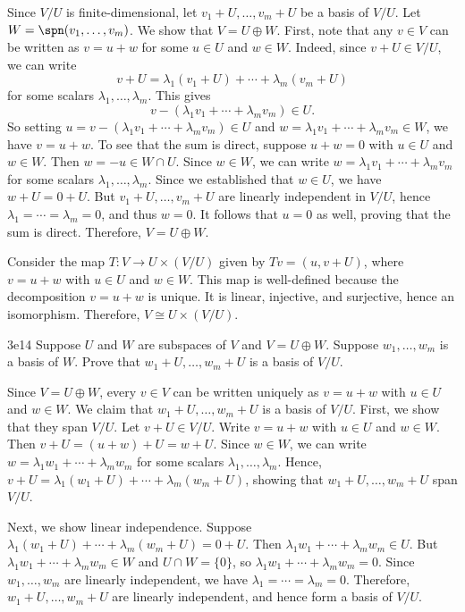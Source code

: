\begin{sol}
    Since $V / U$ is finite-dimensional, let $v_1 + U, \ldots, v_m + U$ be a basis of $V / U$.
	Let $W = \spn(v_1, \ldots, v_m)$.
	We show that $V = U \oplus W$.
	First, note that any $v \in V$ can be written as $v = u + w$ for some $u \in U$ and $w \in W$.
	Indeed, since $v + U \in V / U$, we can write
    \[
    	v + U = \lambda_1 (v_1 + U) + \cdots + \lambda_m (v_m + U)
    \]
    for some scalars $\lambda_1, \ldots, \lambda_m$.
	This gives
    \[
    	v - (\lambda_1 v_1 + \cdots + \lambda_m v_m) \in U.
    \]
    So setting $u = v - (\lambda_1 v_1 + \cdots + \lambda_m v_m) \in U$ and $w = \lambda_1 v_1 + \cdots + \lambda_m v_m \in W$, we have $v = u + w$.
	To see that the sum is direct, suppose $u + w = 0$ with $u \in U$ and $w \in W$.
	Then $w = -u \in W \cap U$.
	Since $w \in W$, we can write $w = \lambda_1 v_1 + \cdots + \lambda_m v_m$ for some scalars $\lambda_1, \ldots, \lambda_m$.
	Since we established that $w \in U$, we have $w + U = 0 + U$.
	But $v_1 + U, \ldots, v_m + U$ are linearly independent in $V / U$, hence $\lambda_1 = \cdots = \lambda_m = 0$, and thus $w = 0$.
	It follows that $u = 0$ as well, proving that the sum is direct.
	Therefore, $V = U \oplus W$.

    Consider the map $T : V \to U \times (V/U)$ given by $Tv = (u, v + U)$, where $v = u + w$ with $u \in U$ and $w \in W$.
	This map is well-defined because the decomposition $v = u + w$ is unique.
	It is linear, injective, and surjective, hence an isomorphism.
	Therefore, $V \cong U \times (V/U)$.
\end{sol}

\begin{exercise}{3e14}
    Suppose $U$ and $W$ are subspaces of $V$ and $V = U \oplus W$.
	Suppose $w_1, \ldots, w_m$ is a basis of $W$.
	Prove that $w_1 + U, \ldots, w_m + U$ is a basis of $V / U$.
\end{exercise}

\begin{sol}
    Since $V = U \oplus W$, every $v \in V$ can be written uniquely as $v = u + w$ with $u \in U$ and $w \in W$.
	We claim that $w_1 + U, \ldots, w_m + U$ is a basis of $V / U$.
	First, we show that they span $V / U$.
	Let $v + U \in V / U$.
	Write $v = u + w$ with $u \in U$ and $w \in W$.
	Then $v + U = (u + w) + U = w + U$.
	Since $w \in W$, we can write $w = \lambda_1 w_1 + \cdots + \lambda_m w_m$ for some scalars $\lambda_1, \ldots, \lambda_m$.
	Hence, $v + U = \lambda_1 (w_1 + U) + \cdots + \lambda_m (w_m + U)$, showing that $w_1 + U, \ldots, w_m + U$ span $V / U$.
    
    Next, we show linear independence.
	Suppose $\lambda_1 (w_1 + U) + \cdots + \lambda_m (w_m + U) = 0 + U$.
	Then $\lambda_1 w_1 + \cdots + \lambda_m w_m \in U$.
	But $\lambda_1 w_1 + \cdots + \lambda_m w_m \in W$ and $U \cap W = \{0\}$, so $\lambda_1 w_1 + \cdots + \lambda_m w_m = 0$.
	Since $w_1, \ldots, w_m$ are linearly independent, we have $\lambda_1 = \cdots = \lambda_m = 0$.
	Therefore, $w_1 + U, \ldots, w_m + U$ are linearly independent, and hence form a basis of $V / U$.
\end{sol}

